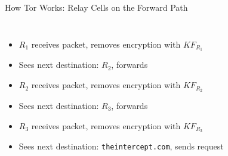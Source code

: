 \documentclass[9pt,a4paper,handout]{beamer}
\begin{document}
\begin{frame}{How Tor Works: Relay Cells on the Forward Path}
\begin{columns}
    \begin{itemize}
      \item $R_1$ receives packet, removes encryption with $KF_{R_1}$
      \item<2-> Sees next destination: $R_2$, forwards
      \item<3-> $R_2$ receives packet, removes encryption with $KF_{R_2}$
      \item<4-> Sees next destination: $R_3$, forwards
      \item<5-> $R_3$ receives packet, removes encryption with $KF_{R_3}$
      \item<6-> Sees next destination: \texttt{theintercept.com}, sends request
    \end{itemize}
  \end{columns}
\end{frame}
\end{document}
